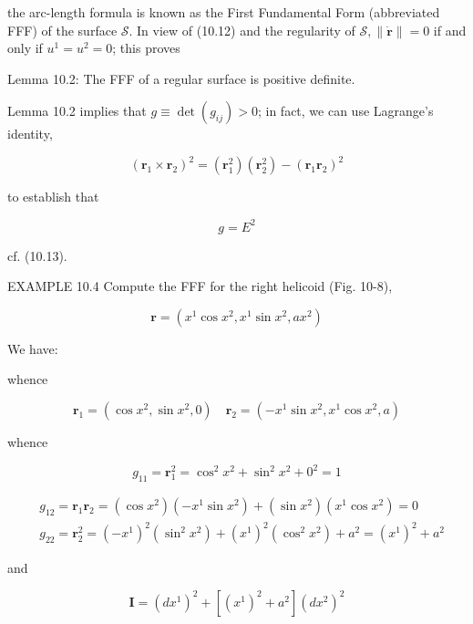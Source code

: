 \documentclass[10pt]{article}
\begin{document}
the arc-length formula is known as the First Fundamental Form (abbreviated FFF) of the surface $\mathscr{S}$. In view of (10.12) and the regularity of $\mathscr{S},\|\dot{\mathbf{r}}\|=0$ if and only if $u^{1}=u^{2}=0$; this proves

Lemma 10.2: The FFF of a regular surface is positive definite.

Lemma 10.2 implies that $g \equiv \operatorname{det}\left(g_{i j}\right)>0$; in fact, we can use Lagrange's identity,

$$
\left(\mathbf{r}_{1} \times \mathbf{r}_{2}\right)^{2}=\left(\mathbf{r}_{1}^{2}\right)\left(\mathbf{r}_{2}^{2}\right)-\left(\mathbf{r}_{1} \mathbf{r}_{2}\right)^{2}
$$

to establish that


\begin{equation*}
g=E^{2} \tag{10.16}
\end{equation*}


cf. (10.13).

EXAMPLE 10.4 Compute the FFF for the right helicoid (Fig. 10-8),

$$
\mathbf{r}=\left(x^{1} \cos x^{2}, x^{1} \sin x^{2}, a x^{2}\right)
$$

We have:

whence

$$
\mathbf{r}_{1}=\left(\cos x^{2}, \sin x^{2}, 0\right) \quad \mathbf{r}_{2}=\left(-x^{1} \sin x^{2}, x^{1} \cos x^{2}, a\right)
$$

whence

$$
g_{11}=\mathbf{r}_{1}^{2}=\cos ^{2} x^{2}+\sin ^{2} x^{2}+0^{2}=1
$$

$$
\begin{aligned}
& g_{12}=\mathbf{r}_{1} \mathbf{r}_{2}=\left(\cos x^{2}\right)\left(-x^{1} \sin x^{2}\right)+\left(\sin x^{2}\right)\left(x^{1} \cos x^{2}\right)=0 \\
& g_{22}=\mathbf{r}_{2}^{2}=\left(-x^{1}\right)^{2}\left(\sin ^{2} x^{2}\right)+\left(x^{1}\right)^{2}\left(\cos ^{2} x^{2}\right)+a^{2}=\left(x^{1}\right)^{2}+a^{2}
\end{aligned}
$$

and

$$
\mathbf{I}=\left(d x^{1}\right)^{2}+\left[\left(x^{1}\right)^{2}+a^{2}\right]\left(d x^{2}\right)^{2}
$$
\end{document}
